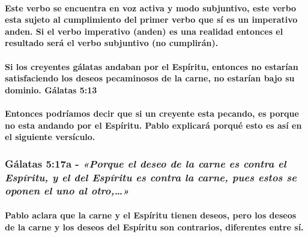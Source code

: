 \documentclass[11a pt,twoside]{article}
\newcommand{\scripture}[1]{%
  {\fontsize{12pt}{16pt}\selectfont\ScriptureFont\itshape #1}%
}
\let\oldsubsubsection\subsubsection
\renewcommand{\subsubsection}{\needspace{4\baselineskip}\oldsubsubsection}
\let\oldparagraph\paragraph
\renewcommand{\paragraph}{\needspace{3\baselineskip}\oldparagraph}
\begin{document}
\paragraph{Este verbo se encuentra en voz activa y modo subjuntivo, este
verbo esta sujeto al cumplimiento del primer verbo que sí es un
imperativo anden. Si el verbo imperativo (anden) es una realidad
entonces el resultado será el verbo subjuntivo (no
cumplirán).}\label{este-verbo-se-encuentra-en-voz-activa-y-modo-subjuntivo-este-verbo-esta-sujeto-al-cumplimiento-del-primer-verbo-que-suxed-es-un-imperativo-anden.-si-el-verbo-imperativo-anden-es-una-realidad-entonces-el-resultado-seruxe1-el-verbo-subjuntivo-no-cumpliruxe1n.}

\paragraph{Si los creyentes gálatas andaban por el Espíritu, entonces no
estarían satisfaciendo los deseos pecaminosos de la carne, no estarían
bajo su dominio. Gálatas
5:13}\label{si-los-creyentes-guxe1latas-andaban-por-el-espuxedritu-entonces-no-estaruxedan-satisfaciendo-los-deseos-pecaminosos-de-la-carne-no-estaruxedan-bajo-su-dominio.-guxe1latas-513}

\paragraph{Entonces podríamos decir que si un creyente esta pecando, es
porque no esta andando por el Espíritu. Pablo explicará porqué esto es
así en el siguiente
versículo.}\label{entonces-podruxedamos-decir-que-si-un-creyente-esta-pecando-es-porque-no-esta-andando-por-el-espuxedritu.-pablo-explicaruxe1-porquuxe9-esto-es-asuxed-en-el-siguiente-versuxedculo.}

\subsubsection{\texorpdfstring{Gálatas 5:17a -
\scripture{«Porque el deseo de la carne es contra el Espíritu, y el del Espíritu es contra la carne, pues estos se oponen el uno al otro,…»}}{Gálatas 5:17a - }}\label{guxe1latas-517a---porque-el-deseo-de-la-carne-es-contra-el-espuxedritu-y-el-del-espuxedritu-es-contra-la-carne-pues-estos-se-oponen-el-uno-al-otro}

\paragraph{Pablo aclara que la carne y el Espíritu tienen deseos, pero
los deseos de la carne y los deseos del Espíritu son contrarios,
diferentes entre
sí.}\label{pablo-aclara-que-la-carne-y-el-espuxedritu-tienen-deseos-pero-los-deseos-de-la-carne-y-los-deseos-del-espuxedritu-son-contrarios-diferentes-entre-suxed.}
\end{document}
